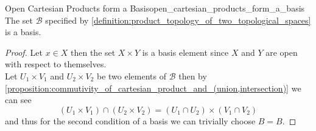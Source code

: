 \begin{proposition}{Open Cartesian Products form a
Basis}{open_cartesian_products_form_a_basis}
The set \( \mathcal{ B } \) specified by
\ref{definition:product_topology_of_two_topological_spaces} is a basis.
\end{proposition}
\begin{proof}
    Let \( x \in  X \) then the set \( X \times Y \) is a basis element since \(
    X\) and \( Y \) are open with respect to themselves. \\
    Let \( U _{ 1 } \times V _{ 1 }  \) and \( U _{ 2 } \times V _{ 2 }  \) be
    two elements of \( \mathcal{ B }   \) then  by
    \ref{proposition:commutivity_of_cartesian_product_and_(union,intersection)}
    we can see
    \[
        \left( U _{ 1 } \times V _{ 1 }  \right) \cap \left( U _{ 2 } \times V
        _{ 2 }  \right) = \left( U _{ 1 } \cap U _{ 2 }  \right) \times \left( V
        _{ 1 } \cap  V _{ 2 } \right) 
    \]
    and thus for the second condition of a basis we can trivially choose \( B =
    B\).
\end{proof}
